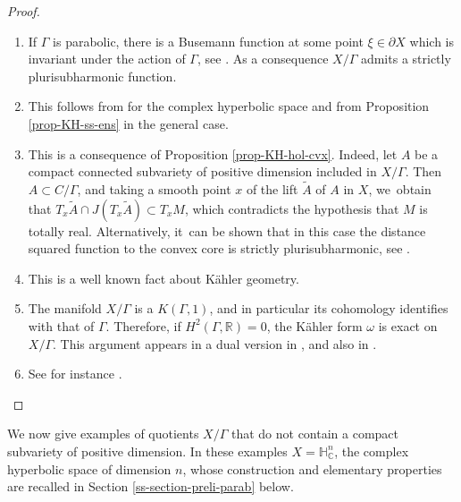 \documentclass[11pt]{article}
\newcommand{\skpt}{\smallskip}
\newenvironment{enumeratea}
{\bgroup\def\theenumi{\alph{enumi}}
\begin{enumerate}}
{\end{enumerate}\egroup}
\theoremstyle{definition}
\newcommand{\C}{\mathbb{C}}
\newcommand{\R}{\mathbb{R}}
\newcommand{\HNC}{\mathbb{H}^{n}_{\C}}
\def\C{\mathbb{C}}
\newcommand{\HNC}{\mathbb{H}^{n}_{\C}}
\begin{document}
\skpt
\begin{proof}
\begin{enumeratea}
\item If $\Gamma$ is parabolic, there is a Busemann function at some point $\xi\in \partial X$ which is invariant under the action of $\Gamma$, see \cite[Prop.\,7.8]{eberleinVisibilityManifolds1973}. As a consequence $X/\Gamma$ admits a strictly plurisubharmonic function.
\item This follows from \cite{deyNoteComplexhyperbolicKleinian2020} for the complex hyperbolic space and from Proposition \ref{prop-KH-ss-ens} in the general case.
\item This is a consequence of Proposition \ref{prop-KH-hol-cvx}. Indeed, let $A$ be a compact connected subvariety of positive dimension included in $X/\Gamma$. Then $A\subset C/\Gamma$, and taking a smooth point $x$ of the lift $\tilde{A}$ of $A$ in $X$, we~obtain that $T_x\tilde{A}\cap J(T_x\tilde{A}) \subset T_xM$, which contradicts the hypothesis that $M$ is totally real. Alternatively, it~can be shown that in this case the distance squared function to the convex core is strictly plurisubharmonic, see \cite{chenDiscreteGroupsHolomorphic2013}.
\item This is a well known fact about Kähler geometry.
\item The manifold $X/\Gamma$ is a $K(\Gamma,1)$, and in particular its cohomology identifies with that of $\Gamma$. Therefore, if $H^{2}(\Gamma,\R)=0$, the Kähler form $\omega$ is exact on $X/\Gamma$. This argument appears in a dual version in \cite[Lem.\,4.2]{miebachSchottkyGroupActions2018}, and also in \cite[p.\,27]{kapovichSurveyComplexHyperbolic2022}.
\item See for instance \cite[Proof of Th.\,1.5]{connellNaturalFlowCritical2023}.\qedhere
\end{enumeratea}
\end{proof}
We now give examples of quotients $X/\Gamma$ that do not contain a compact subvariety of positive dimension. In these examples $X=\HNC$, the complex hyperbolic space of dimension $n$, whose construction and elementary properties are recalled in Section \ref{ss-section-preli-parab} below.
\end{document}
